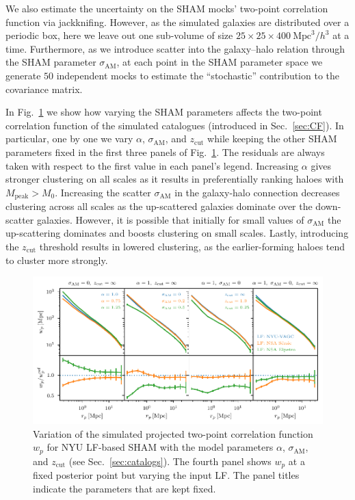 \documentclass[usenatbib,useAMS]{mnras}
\newcommand{\zcut}{\ensuremath{z_{\mathrm{cut}}}}
\newcommand{\scatter}{\ensuremath{\sigma_{\mathrm{AM}}}}
\begin{document}
We also estimate the uncertainty on the \ac{SHAM} mocks' two-point correlation function via jackknifing. However, as the simulated galaxies are distributed over a periodic box, here we leave out one sub-volume of size $25 \times 25 \times 400~\mathrm{Mpc}^{3}/h^3$ at a time. Furthermore, as we introduce scatter into the galaxy--halo relation through the \ac{SHAM} parameter $\scatter$, at each point in the \ac{SHAM} parameter space we generate $50$ independent mocks to estimate the ``stochastic'' contribution to the covariance matrix.

In Fig.~\ref{fig:wps_vary_parameters} we show how varying the \acl{SHAM} parameters affects the two-point correlation function of the simulated catalogues (introduced in Sec.~\ref{sec:CF}). In particular, one by one we vary $\alpha$, $\scatter$, and $\zcut$ while keeping the other \ac{SHAM} parameters fixed in the first three panels of Fig.~\ref{fig:wps_vary_parameters}. The residuals are always taken with respect to the first value in each panel's legend. Increasing $\alpha$ gives stronger clustering on all scales as it results in preferentially ranking haloes with $M_{\mathrm{peak}} > M_0$. Increasing the scatter $\scatter$ in the galaxy-halo connection decreases clustering across all scales as the up-scattered galaxies dominate over the down-scatter galaxies. However, it is possible that initially for small values of $\scatter$ the up-scattering dominates and boosts clustering on small scales. Lastly, introducing the $\zcut$ threshold results in lowered clustering, as the earlier-forming haloes tend to cluster more strongly.

\begin{figure}
    \centering
    \includegraphics[width=1.0\textwidth]{Figures/vary_AM_params.pdf}
    \caption{Variation of the simulated projected two-point correlation function $w_p$ for \ac{NYU} \ac{LF}-based \ac{SHAM} with the model parameters $\alpha$, $\scatter$, and $\zcut$ (see Sec.~\ref{sec:catalogs}). The fourth panel shows $w_p$ at a fixed posterior point but varying the input \ac{LF}. The panel titles indicate the parameters that are kept fixed.} 
    \label{fig:wps_vary_parameters}
\end{figure}
\end{document}
